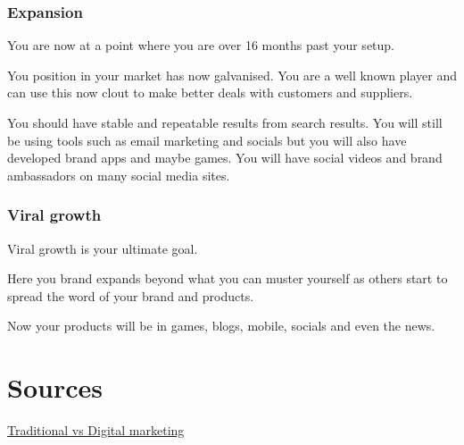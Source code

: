 \documentclass{article}
\begin{document}
\subsubsection{Expansion}
You are now at a point where you are over 16 months past your setup.

You position in your market has now galvanised. You are a well known player and can use this now clout to make better deals with customers and suppliers.

You should have stable and repeatable results from search results. You will still be using tools such as email marketing and socials but you will also have developed brand apps and maybe games. You will have social videos and brand ambassadors on many social media sites.

\subsubsection{Viral growth}
Viral growth is your ultimate goal.

Here you brand expands beyond what you can muster yourself as others start to spread the word of your brand and products.

Now your products will be in games, blogs, mobile, socials and even the news.



\break
\section{Sources}

\href{https://www.statista.com/statistics/693449/digital-vs-traditional-marketing-budget-change-according-to-cmos-usa/} {Traditional vs Digital marketing} \\
\end{document}
